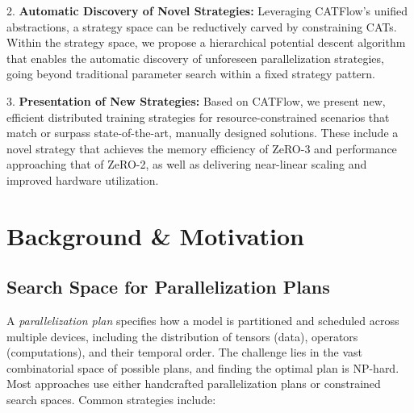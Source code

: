 \documentclass[letterpaper,twocolumn,10pt]{article}
\newcommand{\name}{CATFlow}
\begin{document}
2. \textbf{Automatic Discovery of Novel Strategies:} Leveraging \name{}'s unified abstractions, a strategy space can be reductively carved by constraining CATs. Within the strategy space, we propose a hierarchical potential descent algorithm that enables the automatic discovery of unforeseen parallelization strategies, going beyond traditional parameter search within a fixed strategy pattern.

3. \textbf{Presentation of New Strategies:} Based on \name{}, we present new, efficient distributed training strategies for resource-constrained scenarios that match or surpass state-of-the-art, manually designed solutions. These include a novel strategy that achieves the memory efficiency of ZeRO-3 and performance approaching that of ZeRO-2, as well as delivering near-linear scaling and improved hardware utilization.

\section{Background \& Motivation}

\subsection{Search Space for Parallelization Plans}


A \textit{parallelization plan} specifies how a model is partitioned and scheduled across multiple devices, including the distribution of tensors (data), operators (computations), and their temporal order. The challenge lies in the vast combinatorial space of possible plans, and finding the optimal plan is NP-hard. Most approaches use either handcrafted parallelization plans or constrained search spaces. Common strategies include:
\end{document}
